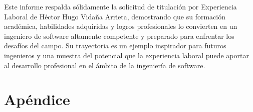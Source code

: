 \documentclass[final, fmstyle, 12pt]{article}
\begin{document}
Este informe respalda sólidamente la solicitud de titulación por Experiencia Laboral de Héctor Hugo Vidaña Arrieta, demostrando que su formación académica, habilidades adquiridas y logros profesionales lo convierten en un ingeniero de software altamente competente y preparado para enfrentar los desafíos del campo. Su trayectoria es un ejemplo inspirador para futuros ingenieros y una muestra del potencial que la experiencia laboral puede aportar al desarrollo profesional en el ámbito de la ingeniería de software.
\vfill %





\vfill %




\newpage

% 


\clearpage
\appendix

\section{Apéndice}
\end{document}
